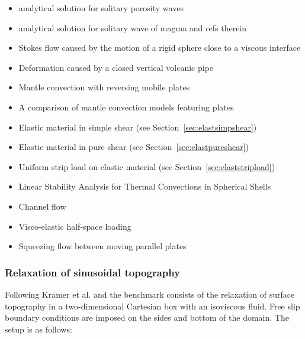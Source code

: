 \begin{itemize}
\item analytical solution for solitary porosity waves \cite{copo15}
\item analytical solution for solitary wave of magma \cite{dahe16} and refs therein
\item Stokes flow caused by the motion of a rigid sphere close to a viscous interface \cite{dagr98}
\item Deformation caused by a closed vertical volcanic pipe \cite{boda99}
\item Mantle convection with reversing mobile plates \cite{kogk05}
\item A comparison of mantle convection models featuring plates \cite{stlh14}
\item Elastic material in simple shear (see Section~\ref{sec:elastsimpshear})
\item Elastic material in pure shear (see Section~\ref{sec:elastpureshear})
\item Uniform strip load on elastic material (see Section~\ref{sec:elaststripload})
\item Linear Stability Analysis for Thermal Convections in Spherical Shells \cite{yuwa19}
\item Channel flow \cite{manc08}
\item Visco-elastic half-space loading \cite{hask35,nala82}
\item Squeezing flow between moving parallel plates \cite{gugu77}
\end{itemize}


\subsubsection{Relaxation of sinusoidal topography}

Following Kramer et al. \cite[Section 3.1.1]{krwd12} and \cite{robh17} 
the benchmark consists of the relaxation of surface topography in a 
two-dimensional Cartesian box with an isoviscous fluid. 
Free slip boundary conditions are imposed on the sides and bottom of the domain.
The setup is as follows:

